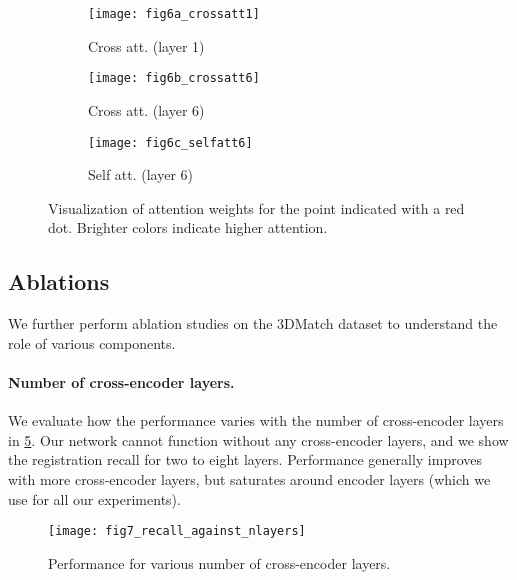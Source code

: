 \documentclass[10pt,twocolumn,letterpaper]{article}
\begin{document}
\begin{figure}[t]
    \centering
    \begin{subfigure}[b]{0.32\linewidth}
        \centering
        \texttt{[image: fig6a\_crossatt1]}
        \caption{Cross att. (layer 1)}
        \label{fig:att_viz_cross1}
    \end{subfigure}
    \hfill
    \begin{subfigure}[b]{0.32\linewidth}
        \centering
        \texttt{[image: fig6b\_crossatt6]}
        \caption{Cross att. (layer 6)}
        \label{fig:att_viz_cross6}
    \end{subfigure}
    \hfill
    \begin{subfigure}[b]{0.32\linewidth}
        \centering
        \texttt{[image: fig6c\_selfatt6]}
        \caption{Self att. (layer 6)}
        \label{fig:att_viz_self6}
    \end{subfigure}
    \vspace{-2mm}
    \caption[Visualization of attention weights]{Visualization of attention weights for the point indicated with a red dot. Brighter colors indicate higher attention.}
    \label{fig:att_viz}
\end{figure}

\subsection{Ablations}\label{sect:ablations}
We further perform ablation studies on the 3DMatch dataset to understand the role of various components.

\vspace{-4mm}
\paragraph{Number of cross-encoder layers.}
We evaluate how the performance varies with the number of cross-encoder layers in \cref{fig:num-layers}. Our network cannot function without any cross-encoder layers, and we show the registration recall for two to eight layers.
Performance generally improves with more cross-encoder layers, but saturates around  encoder layers (which we use for all our experiments).

\begin{figure}[t]
    \centering
    \texttt{[image: fig7\_recall\_against\_nlayers]}
    \vspace{-2mm}
    \caption{Performance for various number of cross-encoder layers.}
    \label{fig:num-layers}
\end{figure}
\end{document}
